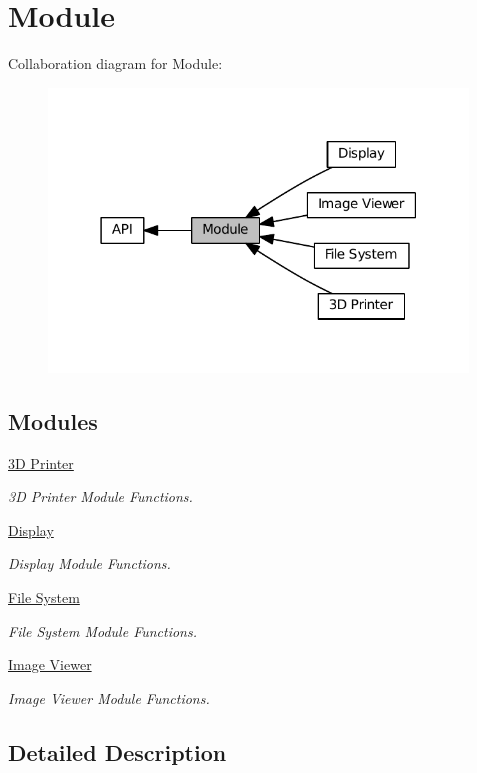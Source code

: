 \hypertarget{group__MODULE}{}\section{Module}
\label{group__MODULE}
Collaboration diagram for Module\+:\nopagebreak
\begin{figure}[H]
\begin{center}
\leavevmode
\includegraphics[width=316pt]{group__MODULE}
\end{center}
\end{figure}
\subsection*{Modules}
\begin{DoxyCompactItemize}
\item 
\hyperlink{group__MODULE__3D__PRINTER}{3\+D Printer}
\begin{DoxyCompactList}\small\item\em 3D Printer Module Functions. \end{DoxyCompactList}\item 
\hyperlink{group__MODULE__DISPLAY}{Display}
\begin{DoxyCompactList}\small\item\em Display Module Functions. \end{DoxyCompactList}\item 
\hyperlink{group__MODULE__FILE__SYSTEM}{File System}
\begin{DoxyCompactList}\small\item\em File System Module Functions. \end{DoxyCompactList}\item 
\hyperlink{group__MODULE__IMAGE__VIEWER}{Image Viewer}
\begin{DoxyCompactList}\small\item\em Image Viewer Module Functions. \end{DoxyCompactList}\end{DoxyCompactItemize}


\subsection{Detailed Description}
